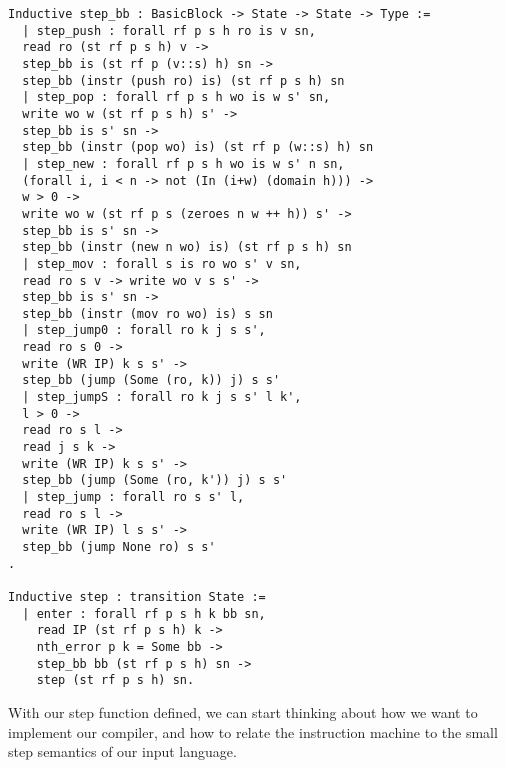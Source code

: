\begin{verbatim}
Inductive step_bb : BasicBlock -> State -> State -> Type := 
  | step_push : forall rf p s h ro is v sn,
  read ro (st rf p s h) v -> 
  step_bb is (st rf p (v::s) h) sn -> 
  step_bb (instr (push ro) is) (st rf p s h) sn
  | step_pop : forall rf p s h wo is w s' sn,
  write wo w (st rf p s h) s' -> 
  step_bb is s' sn ->
  step_bb (instr (pop wo) is) (st rf p (w::s) h) sn
  | step_new : forall rf p s h wo is w s' n sn,
  (forall i, i < n -> not (In (i+w) (domain h))) ->
  w > 0 ->
  write wo w (st rf p s (zeroes n w ++ h)) s' ->
  step_bb is s' sn -> 
  step_bb (instr (new n wo) is) (st rf p s h) sn 
  | step_mov : forall s is ro wo s' v sn, 
  read ro s v -> write wo v s s' -> 
  step_bb is s' sn -> 
  step_bb (instr (mov ro wo) is) s sn
  | step_jump0 : forall ro k j s s', 
  read ro s 0 ->
  write (WR IP) k s s' -> 
  step_bb (jump (Some (ro, k)) j) s s'
  | step_jumpS : forall ro k j s s' l k', 
  l > 0 ->
  read ro s l ->
  read j s k -> 
  write (WR IP) k s s' -> 
  step_bb (jump (Some (ro, k')) j) s s'
  | step_jump : forall ro s s' l, 
  read ro s l ->
  write (WR IP) l s s' -> 
  step_bb (jump None ro) s s'
.

Inductive step : transition State :=
  | enter : forall rf p s h k bb sn,
    read IP (st rf p s h) k -> 
    nth_error p k = Some bb -> 
    step_bb bb (st rf p s h) sn ->
    step (st rf p s h) sn.
\end{verbatim}

With our step function defined, we can start thinking about how we want to
implement our compiler, and how to relate the instruction machine to the small
step semantics of our input language.  


